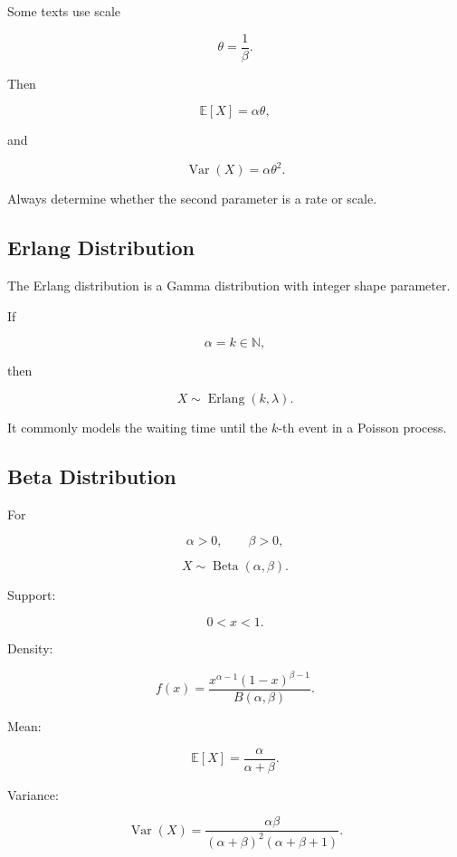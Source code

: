 Some texts use scale

\[
\theta
=
\frac1\beta.
\]

Then

\[
\boxed{
\mathbb{E}[X]
=
\alpha\theta,
}
\]

and

\[
\boxed{
\operatorname{Var}(X)
=
\alpha\theta^2.
}
\]

Always determine whether the second parameter is a rate or scale.

\subsection{Erlang Distribution}
\label{subsec:erlang-distribution-reference}

The Erlang distribution is a Gamma distribution with integer shape parameter.

If

\[
\alpha=k\in\mathbb{N},
\]

then

\[
\boxed{
X
\sim
\operatorname{Erlang}(k,\lambda).
}
\]

It commonly models the waiting time until the \(k\)-th event in a Poisson
process.

\subsection{Beta Distribution}
\label{subsec:beta-distribution-reference}

For

\[
\alpha>0,
\qquad
\beta>0,
\]

\[
\boxed{
X\sim\operatorname{Beta}(\alpha,\beta).
}
\]

Support:

\[
\boxed{
0<x<1.
}
\]

Density:

\[
\boxed{
f(x)
=
\frac{
x^{\alpha-1}
(1-x)^{\beta-1}
}{
B(\alpha,\beta)
}.
}
\]

Mean:

\[
\boxed{
\mathbb{E}[X]
=
\frac{
\alpha
}{
\alpha+\beta
}.
}
\]

Variance:

\[
\boxed{
\operatorname{Var}(X)
=
\frac{
\alpha\beta
}{
(\alpha+\beta)^2
(\alpha+\beta+1)
}.
}
\]

